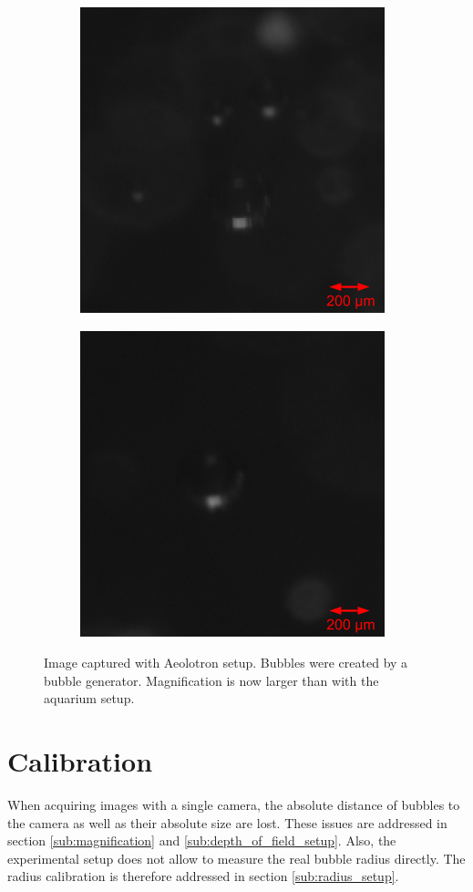			\begin{figure}
				\begin{subfigure}[t]{.55\textwidth}
				\centering
				\includegraphics[scale=0.5]{images/aeolotron_result_small_1.png}
				\caption{}
				\label{subfig:aquarium_result_sat}
			\end{subfigure}\hfill
			\begin{subfigure}[t]{.55\textwidth}
				\centering
				\includegraphics[scale=0.5]{images/aeolotron_result_small_2.png}
				\caption{}
			\end{subfigure}
				\caption{Image captured with Aeolotron setup. Bubbles were created by a bubble generator. Magnification is now larger than with the aquarium setup.}
								
				\label{fig:aeolotron_result}
			\end{figure}
	
	
	\section{Calibration}\label{calibration_setup}
		When acquiring images with a single camera, the absolute distance of bubbles to the camera as well as their absolute size are lost. These issues are addressed in section \ref{sub:magnification} and \ref{sub:depth_of_field_setup}. Also, the experimental setup does not allow to measure the real bubble radius directly. The radius calibration is therefore addressed in section \ref{sub:radius_setup}.
